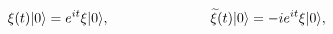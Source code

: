 \begin{equation}
\xi(t)|0 \rangle = e^{it} \xi|0 \rangle,
\hspace{1.0in}
{\widetilde \xi}(t)|0 \rangle =-i e^{it} \xi|0 \rangle,
\end{equation}

